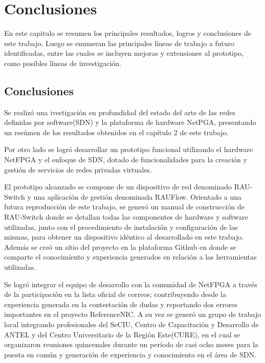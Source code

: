 \chapter{Conclusiones}

\ifpdf
    \graphicspath{{Chapter8/Figs/Raster/}{Chapter8/Figs/PDF/}{Chapter8/Figs/}}
\else
    \graphicspath{{Chapter8/Figs/Vector/}{Chapter8/Figs/}}
\fi

En este capitulo se resumen los principales resultados, logros y conclusiones de este trabajo. Luego se enumeran las principales l\'ineas de trabajo a futuro identificadas, entre las cuales se incluyen mejoras y extensiones al prototipo, como posibles l\'ineas de investigaci\'on.

\section{Conclusiones}
Se realiz\'o una ivestigaci\'on en profundidad del estado del arte de las redes definidas por software(SDN) y la plataforma de hardware NetPGA, presentando un res\'umen de los resultados obtenidos en el cap\'itulo 2 de este trabajo.

Por otro lado se logr\'o desarrollar un prototipo funcional utilizando el hardware NetFPGA y el enfoque de SDN, dotado de funcionalidades para la creaci\'on y gesti\'on de servicios de redes privadas virtuales. 

El prototipo alcanzado se compone de un dispositivo de red denominado RAU-Switch y una aplicaci\'on de gesti\'on denominada RAUFlow. Orientado a una futura reproducci\'on de este trabajo, se gener\'o un manual de construcci\'on de RAU-Switch donde se detallan todas las componentes de hardware y software utilizadas, junto con el procedimiento de instalaci\'on y configuraci\'on de las mismas, para obtener un dispositivo id\'entico al desarrollado en este trabajo. Adem\'as se cre\'o un sitio del proyecto en la plataforma Github en donde se comparte el conocimiento y experiencia generados en relaci\'on a las herramientas utilizadas. 

Se logr\'o integrar el equipo de desarrollo con la comunidad de NetFPGA a trav\'es de la participaci\'on en la lista oficial de correos; contribuyendo desde la experiencia generada en la contestaci\'on de dudas y reportando dos errores importantes en el proyecto ReferenceNIC. A su vez se gener\'o un grupo de trabajo local integrando profesionales del SeCIU, Centro de Capacitaci\'on y Desarrollo de ANTEL y del Centro Universitario de la Regi\'on Este(CURE), en el cual se organizaron reuniones quincenales durante un per\'iodo de casi ocho meses para la puesta en com\'un y generaci\'on de experiencia y conocimiento en el \'area de SDN.

